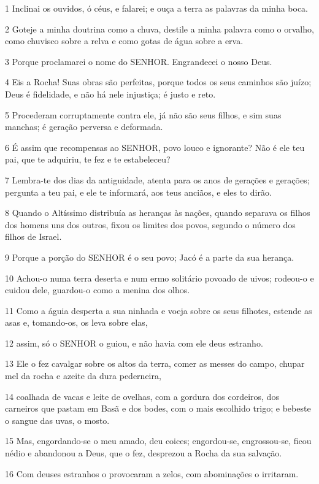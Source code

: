 \par 1 Inclinai os ouvidos, ó céus, e falarei; e ouça a terra as palavras da minha boca.
\par 2 Goteje a minha doutrina como a chuva, destile a minha palavra como o orvalho, como chuvisco sobre a relva e como gotas de água sobre a erva.
\par 3 Porque proclamarei o nome do SENHOR. Engrandecei o nosso Deus.
\par 4 Eis a Rocha! Suas obras são perfeitas, porque todos os seus caminhos são juízo; Deus é fidelidade, e não há nele injustiça; é justo e reto.
\par 5 Procederam corruptamente contra ele, já não são seus filhos, e sim suas manchas; é geração perversa e deformada.
\par 6 É assim que recompensas ao SENHOR, povo louco e ignorante? Não é ele teu pai, que te adquiriu, te fez e te estabeleceu?
\par 7 Lembra-te dos dias da antiguidade, atenta para os anos de gerações e gerações; pergunta a teu pai, e ele te informará, aos teus anciãos, e eles to dirão.
\par 8 Quando o Altíssimo distribuía as heranças às nações, quando separava os filhos dos homens uns dos outros, fixou os limites dos povos, segundo o número dos filhos de Israel.
\par 9 Porque a porção do SENHOR é o seu povo; Jacó é a parte da sua herança.
\par 10 Achou-o numa terra deserta e num ermo solitário povoado de uivos; rodeou-o e cuidou dele, guardou-o como a menina dos olhos.
\par 11 Como a águia desperta a sua ninhada e voeja sobre os seus filhotes, estende as asas e, tomando-os, os leva sobre elas,
\par 12 assim, só o SENHOR o guiou, e não havia com ele deus estranho.
\par 13 Ele o fez cavalgar sobre os altos da terra, comer as messes do campo, chupar mel da rocha e azeite da dura pederneira,
\par 14 coalhada de vacas e leite de ovelhas, com a gordura dos cordeiros, dos carneiros que pastam em Basã e dos bodes, com o mais escolhido trigo; e bebeste o sangue das uvas, o mosto.
\par 15 Mas, engordando-se o meu amado, deu coices; engordou-se, engrossou-se, ficou nédio e abandonou a Deus, que o fez, desprezou a Rocha da sua salvação.
\par 16 Com deuses estranhos o provocaram a zelos, com abominações o irritaram.

